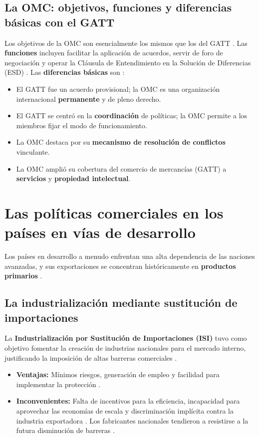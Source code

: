 \subsection{La OMC: objetivos, funciones y diferencias básicas con el GATT}
Los objetivos de la OMC son esencialmente los mismos que los del GATT . Las \textbf{funciones} incluyen facilitar la aplicación de acuerdos, servir de foro de negociación y operar la Cláusula de Entendimiento en la Solución de Diferencias (ESD) .
Las \textbf{diferencias básicas} son :
\begin{itemize}
    \item El GATT fue un acuerdo provisional; la OMC es una organización internacional \textbf{permanente} y de pleno derecho.
    \item El GATT se centró en la \textbf{coordinación} de políticas; la OMC permite a los miembros fijar el modo de funcionamiento.
    \item La OMC destaca por su \textbf{mecanismo de resolución de conflictos} vinculante.
    \item La OMC amplió su cobertura del comercio de mercancías (GATT) a \textbf{servicios} y \textbf{propiedad intelectual}.
\end{itemize}

\section{Las políticas comerciales en los países en vías de desarrollo}
Los países en desarrollo a menudo enfrentan una alta dependencia de las naciones avanzadas, y sus exportaciones se concentran históricamente en \textbf{productos primarios} .

\subsection{La industrialización mediante sustitución de importaciones}
La \textbf{Industrialización por Sustitución de Importaciones (ISI)} tuvo como objetivo fomentar la creación de industrias nacionales para el mercado interno, justificando la imposición de altas barreras comerciales .
\begin{itemize}
    \item \textbf{Ventajas:} Mínimos riesgos, generación de empleo y facilidad para implementar la protección .
    \item \textbf{Inconvenientes:} Falta de incentivos para la eficiencia, incapacidad para aprovechar las economías de escala y discriminación implícita contra la industria exportadora . Los fabricantes nacionales tendieron a resistirse a la futura disminución de barreras .
\end{itemize}


